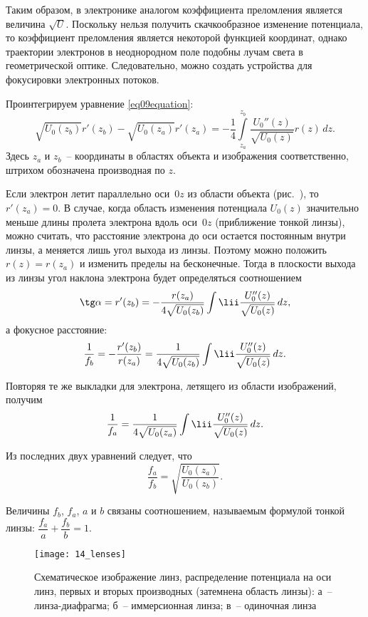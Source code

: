 Таким образом, в электронике аналогом коэффициента преломления является величина
\( \sqrt{U} \). Поскольку нельзя получить скачкообразное изменение потенциала,
то коэффициент преломления является некоторой функцией координат, однако
траектории электронов в неоднородном поле подобны лучам света в геометрической
оптике. Следовательно, можно создать устройства для фокусировки электронных
потоков.

Проинтегрируем уравнение \eqref{eq09equation}:
\[
  \sqrt{U_0(z_b)}r'(z_b) - \sqrt{U_0(z_a)}r'(z_a) = -\frac{1}{4}
    \int\limits_{z_a}^{z_b} \frac{U_0''(z)}{\sqrt{U_0(z)}} r(z)\,dz.
\]
Здесь \( z_a \) и \( z_b \)~-- координаты в областях объекта и изображения
соответственно, штрихом обозначена производная по \( z \).

Если электрон летит параллельно оси~\( 0z \) из области объекта
(рис.~), то \( r'(z_a) = 0 \). В случае, когда область изменения
потенциала \( U_0(z) \) значительно меньше длины пролета электрона вдоль
оси~\( 0z \) (приближение тонкой линзы), можно считать, что расстояние электрона
до оси остается постоянным внутри линзы, а меняется лишь угол выхода из линзы.
Поэтому можно положить \( r(z) = r(z_a) \) и изменить пределы на бесконечные.
Тогда в плоскости выхода из линзы угол наклона электрона будет определяться
соотношением
\[
  \tg\alpha = r'(z_b) = -\frac{r(z_a)}{4\sqrt{U_0(z_b)}} \int\lii
    \frac{U_0''(z)}{\sqrt{U_0(z)}}\,dz,
\]
а фокусное расстояние:
\[
  \frac{1}{f_b} = -\frac{r'(z_b)}{r(z_a)} = \frac{1}{4\sqrt{U_0(z_b)}}
    \int\lii \frac{U_0''(z)}{\sqrt{U_0(z)}}\,dz.
\]

Повторяя те же выкладки для электрона, летящего из области изображений, получим
\[
  \frac{1}{f_a} = \frac{1}{4\sqrt{U_0(z_a)}} \int\lii
    \frac{U_0''(z)}{\sqrt{U_0(z)}}\,dz.
\]

Из последних двух уравнений следует, что
\[
  \frac{f_a}{f_b} = \sqrt{\frac{U_0(z_a)}{U_0(z_b)}}.
\]

Величины \( f_b \), \( f_a \), \( a \) и \( b \) связаны соотношением,
называемым формулой тонкой линзы:
\(
 \dfrac{f_a}{a} + \dfrac{f_b}{b} = 1
\).


\begin{figure}[p!]
  \center
  \texttt{[image: 14\_lenses]} \\
  \caption{Схематическое изображение линз, распределение потенциала на оси линз,
    первых и вторых производных (затемнена область линзы): а~-- линза-диафрагма;
    б~-- иммерсионная линза; в~-- одиночная линза}
  \label{pic14lenses}
\end{figure}

